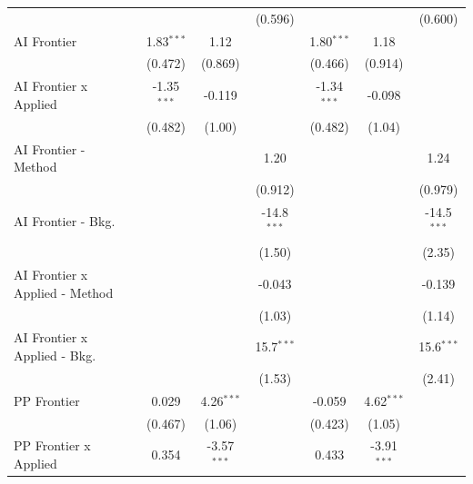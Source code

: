 \begin{tabular}{lcccccc}
                                  &               &               & (0.596)       &               &               & (0.600)\\   
   AI Frontier                    & 1.83$^{***}$  & 1.12          &               & 1.80$^{***}$  & 1.18          &   \\   
                                  & (0.472)       & (0.869)       &               & (0.466)       & (0.914)       &   \\   
   AI Frontier x Applied          & -1.35$^{***}$ & -0.119        &               & -1.34$^{***}$ & -0.098        &   \\   
                                  & (0.482)       & (1.00)        &               & (0.482)       & (1.04)        &   \\   
   AI Frontier - Method           &               &               & 1.20          &               &               & 1.24\\   
                                  &               &               & (0.912)       &               &               & (0.979)\\   
   AI Frontier - Bkg.             &               &               & -14.8$^{***}$ &               &               & -14.5$^{***}$\\   
                                  &               &               & (1.50)        &               &               & (2.35)\\   
   AI Frontier x Applied - Method &               &               & -0.043        &               &               & -0.139\\   
                                  &               &               & (1.03)        &               &               & (1.14)\\   
   AI Frontier x Applied - Bkg.   &               &               & 15.7$^{***}$  &               &               & 15.6$^{***}$\\   
                                  &               &               & (1.53)        &               &               & (2.41)\\   
   PP Frontier                    & 0.029         & 4.26$^{***}$  &               & -0.059        & 4.62$^{***}$  &   \\   
                                  & (0.467)       & (1.06)        &               & (0.423)       & (1.05)        &   \\   
   PP Frontier x Applied          & 0.354         & -3.57$^{***}$ &               & 0.433         & -3.91$^{***}$ &   \\   

\end{tabular}
